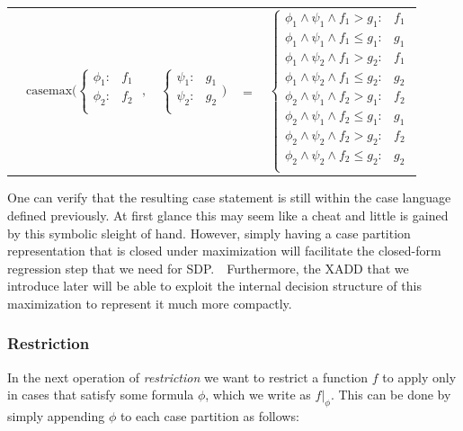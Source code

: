 \documentclass[twoside,11pt]{article}
\newcommand{\casemax}{\mathrm{casemax}}
\begin{document}
{%
\begin{center}
\begin{tabular}{r c c c l}
&
\hspace{-9mm} $\casemax \Bigg(
  \begin{cases}
    \phi_1: & f_1 \\ 
    \phi_2: & f_2 \\ 
  \end{cases}$
$,$
&
\hspace{-4mm}
  $\begin{cases}
    \psi_1: & g_1 \\ 
    \psi_2: & g_2 \\ 
  \end{cases} \Bigg)$
&
\hspace{-4mm} 
$ = $
&
\hspace{-4mm}
  $\begin{cases}
  \phi_1 \wedge \psi_1 \wedge f_1 > g_1    : & f_1 \\ 
  \phi_1 \wedge \psi_1 \wedge f_1 \leq g_1 : & g_1 \\ 
  \phi_1 \wedge \psi_2 \wedge f_1 > g_2    : & f_1 \\ 
  \phi_1 \wedge \psi_2 \wedge f_1 \leq g_2 : & g_2 \\ 
  \phi_2 \wedge \psi_1 \wedge f_2 > g_1    : & f_2 \\ 
  \phi_2 \wedge \psi_1 \wedge f_2 \leq g_1 : & g_1 \\ 
  \phi_2 \wedge \psi_2 \wedge f_2 > g_2    : & f_2 \\ 
  \phi_2 \wedge \psi_2 \wedge f_2 \leq g_2 : & g_2 \\ 
  \end{cases}$
\end{tabular}
\end{center}
}
One can verify that the resulting case statement is still
within the case language defined previously.  At first
glance this may seem like a cheat and little is gained
by this symbolic sleight of hand.  However, simply
having a case partition representation that is closed under 
maximization will facilitate the closed-form regression 
step that we need for SDP.\ \  Furthermore, the 
XADD that we introduce later will be able to exploit the 
internal decision structure of this
maximization to represent it much more compactly.

\subsubsection*{Restriction}
In the next operation of \emph{restriction} %
we want to restrict a function $f$ to apply only in cases
that satisfy some formula $\phi$, which we write as $f|_{\phi}$.  
This can be done by simply appending $\phi$ to each case partition
as follows:
\end{document}
